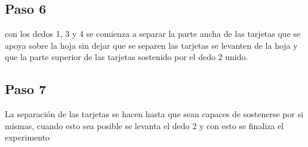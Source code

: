 \documentclass{article}
\begin{document}
\subsection{Paso 6}
con los dedos 1, 3 y 4 se comienza a separar la parte ancha de las tarjetas que se apoya sobre la hoja sin dejar que se separen las tarjetas se levanten de la hoja y que la parte superior de las tarjetas sostenido por el dedo 2 unido.

\subsection{Paso 7}
La separación de las tarjetas se hacen hasta que sean capaces de sostenerse por si mismas, cuando esto sea posible se levanta el dedo 2 y con esto se finaliza el experimento
\end{document}
